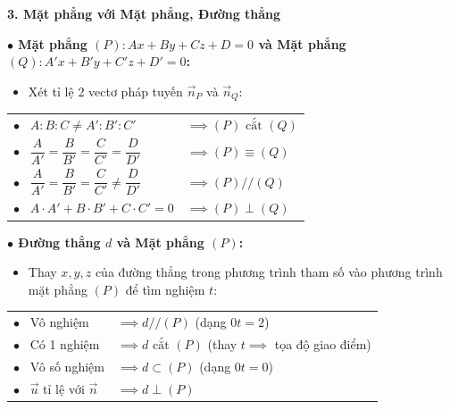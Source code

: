 \documentclass[12pt,a4paper]{article}
\begin{document}
\begin{theorybox}
    \textbf{\textcolor{deepblue}{\large 3. Mặt phẳng với Mặt phẳng, Đường thẳng}}
    \par\vspace{6pt}

\textbf{\textcolor{amberorange}{$\bullet$ Mặt phẳng $(P)\colon Ax+By+Cz+D=0$ và Mặt phẳng $(Q)\colon A'x+B'y+C'z+D'=0$:}}
    \begin{itemize}
        \item Xét tỉ lệ 2 vectơ pháp tuyến $\vec{n}_P$ và $\vec{n}_Q$:
    \end{itemize}
    \renewcommand{\arraystretch}{1.45}
    \begin{center}
    \begin{tabular}{l @{\hskip 25pt} l}
        $\bullet$ \ $A : B : C \neq A' : B' : C'$ & $\implies (P) \text{ cắt } (Q)$ \\[6pt]
        $\bullet$ \ $\dfrac{A}{A'} = \dfrac{B}{B'} = \dfrac{C}{C'} = \dfrac{D}{D'}$ & $\implies (P) \equiv (Q)$ \\[6pt]
        $\bullet$ \ $\dfrac{A}{A'} = \dfrac{B}{B'} = \dfrac{C}{C'} \neq \dfrac{D}{D'}$ & $\implies (P) // (Q)$ \\[6pt]
        $\bullet$ \ $A \cdot A' + B \cdot B' + C \cdot C' = 0$ & $\implies (P) \perp (Q)$ \\
    \end{tabular}
    \end{center}

    \vspace{4pt}
    \textbf{\textcolor{amberorange}{$\bullet$ Đường thẳng $d$ và Mặt phẳng $(P)$:}}
    \begin{itemize}
        \item Thay $x, y, z$ của đường thẳng trong phương trình tham số vào phương trình mặt phẳng $(P)$ để tìm nghiệm $t$:
    \end{itemize}
    \renewcommand{\arraystretch}{1.4}
    \begin{center}
    \begin{tabular}{l @{\hskip 12pt} l}
        $\bullet$ \ Vô nghiệm & $\implies d // (P)$ \quad (dạng $0t = 2$) \\
        $\bullet$ \ Có 1 nghiệm & $\implies d \text{ cắt } (P)$ \quad (thay $t \implies$ tọa độ giao điểm) \\
        $\bullet$ \ Vô số nghiệm & $\implies d \subset (P)$ \quad (dạng $0t = 0$) \\
        $\bullet$ \ $\vec{u}$ tỉ lệ với $\vec{n}$ & $\implies d \perp (P)$ \\
    \end{tabular}
    \end{center}
\end{theorybox}
\end{document}
